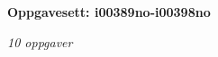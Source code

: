 \centerline{\bf Oppgavesett: i00389no-i00398no}
\vskip 10pt
\centerline{\it 10 oppgaver}\vskip 10pt
\vskip 10pt
